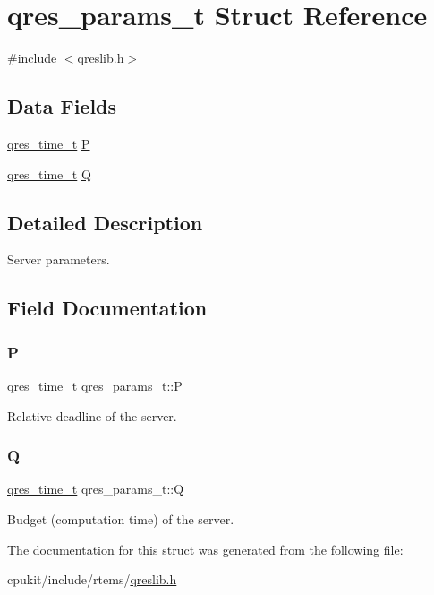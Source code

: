 \hypertarget{structqres__params__t}{}\section{qres\+\_\+params\+\_\+t Struct Reference}
\label{structqres__params__t}


{\ttfamily \#include $<$qreslib.\+h$>$}

\subsection*{Data Fields}
\begin{DoxyCompactItemize}
\item 
\mbox{\hyperlink{qreslib_8h_a3b9787875068c267879232825b2a82e2}{qres\+\_\+time\+\_\+t}} \mbox{\hyperlink{structqres__params__t_adc93eeb9c7c1e3ec205e4b1cc5218fa4}{P}}
\item 
\mbox{\hyperlink{qreslib_8h_a3b9787875068c267879232825b2a82e2}{qres\+\_\+time\+\_\+t}} \mbox{\hyperlink{structqres__params__t_a7afc5ae868985be2db6669298160e478}{Q}}
\end{DoxyCompactItemize}


\subsection{Detailed Description}
Server parameters. 

\subsection{Field Documentation}
\mbox{\label{structqres__params__t_adc93eeb9c7c1e3ec205e4b1cc5218fa4}} 
\subsubsection{\texorpdfstring{P}{P}}
{\footnotesize\ttfamily \mbox{\hyperlink{qreslib_8h_a3b9787875068c267879232825b2a82e2}{qres\+\_\+time\+\_\+t}} qres\+\_\+params\+\_\+t\+::P}

Relative deadline of the server. \mbox{\label{structqres__params__t_a7afc5ae868985be2db6669298160e478}} 
\subsubsection{\texorpdfstring{Q}{Q}}
{\footnotesize\ttfamily \mbox{\hyperlink{qreslib_8h_a3b9787875068c267879232825b2a82e2}{qres\+\_\+time\+\_\+t}} qres\+\_\+params\+\_\+t\+::Q}

Budget (computation time) of the server. 

The documentation for this struct was generated from the following file\+:\begin{DoxyCompactItemize}
\item 
cpukit/include/rtems/\mbox{\hyperlink{qreslib_8h}{qreslib.\+h}}\end{DoxyCompactItemize}
